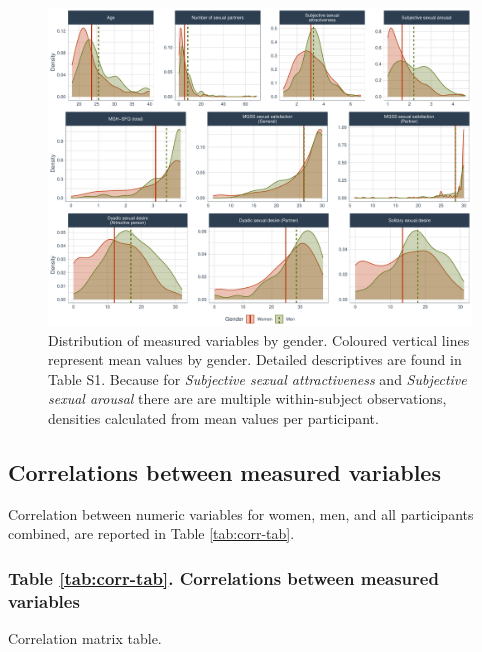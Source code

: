 \documentclass[
  bookmarksnumbered]{article}
\begin{document}
\begin{figure}
\centering
\includegraphics{Sexual_Desire_Arousal_V2_files/figure-latex/density-plot-1.pdf}
\caption{\label{fig:density-plot}Distribution of measured variables by gender. Coloured vertical lines represent mean values by gender. Detailed descriptives are found in Table S1. Because for \emph{Subjective sexual attractiveness} and \emph{Subjective sexual arousal} there are are multiple within-subject observations, densities calculated from mean values per participant.}
\end{figure}

\subsection{Correlations between measured variables}\label{correlations-between-measured-variables}

Correlation between numeric variables for women, men, and all participants combined, are reported in Table \ref{tab:corr-tab}.

\subsubsection{Table \ref{tab:corr-tab}. Correlations between measured variables}\label{table-reftabcorr-tab.-correlations-between-measured-variables}

Correlation matrix table.
\end{document}
